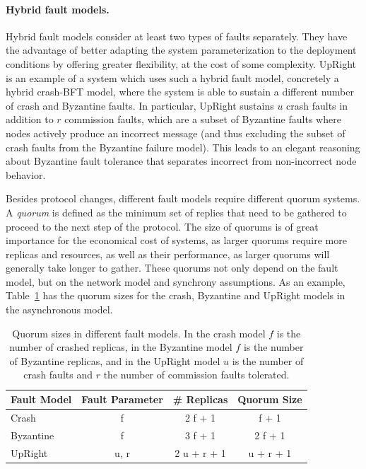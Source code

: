 \paragraph{Hybrid fault models.}
Hybrid fault models consider at least two types of faults
separately. They have the advantage of better adapting the
system parameterization to the deployment conditions by offering
greater flexibility, at the cost of some complexity.
UpRight~\cite{upright} is an example of a system which uses such
a hybrid fault model, concretely a hybrid crash-\ac{BFT} model, where
the system is able to sustain a different number of crash and
Byzantine faults. In particular, UpRight sustains $u$ crash faults in addition
to $r$ commission faults, which are a subset of Byzantine faults
where nodes actively produce an incorrect message (and thus
excluding the subset of crash faults from the Byzantine failure
model). This leads to an elegant reasoning about Byzantine fault
tolerance that separates incorrect from non-incorrect node
behavior.

Besides protocol changes, different fault models require
different quorum systems. A \emph{quorum} is defined as the
minimum set of replies that need to be gathered to proceed to the
next step of the protocol. The size of quorums is of great
importance for the economical cost of systems, as larger quorums require
more replicas and resources, as well as their performance, as
larger quorums will generally take longer to gather. These
quorums not only depend on the fault model, but on the network
model and synchrony assumptions. As an example,
Table~\ref{tab:quorum} has the quorum sizes for the crash,
Byzantine and UpRight models in the asynchronous model.

\begin{table}[ht]
    \centering
    \caption{Quorum sizes in different fault models. In the crash
    model $f$ is the number of crashed replicas, in the Byzantine
    model $f$ is the number of Byzantine replicas, and in the
    UpRight model $u$ is the number of crash faults and $r$
    the number of commission faults tolerated.}
    \begin{tabular}{|l|c|c|c|}
        \hline
        \textbf{Fault Model} & \textbf{Fault Parameter} & \textbf{\# Replicas} & \textbf{Quorum Size} \\
        \hline
        Crash & f & 2 f + 1 & f + 1 \\
        \hline
        Byzantine & f & 3 f + 1 & 2 f + 1 \\
        \hline
        UpRight & u, r & 2 u + r + 1 & u + r + 1 \\
        \hline
    \end{tabular}\label{tab:quorum}
\end{table}

